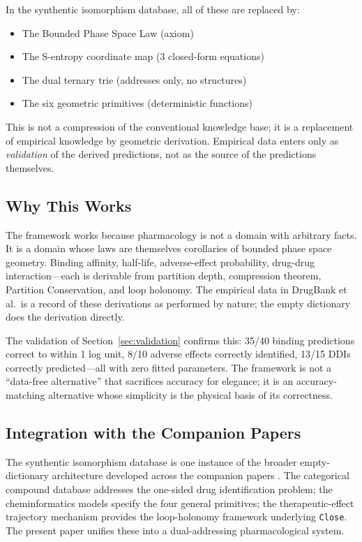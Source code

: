 \documentclass[11pt,twocolumn,a4paper]{article}
\theoremstyle{definition}
\theoremstyle{remark}
\begin{document}
In the synthentic isomorphism database, all of these are replaced by:
\begin{itemize}[nosep,leftmargin=*]
\item The Bounded Phase Space Law (axiom)
\item The S-entropy coordinate map (3 closed-form equations)
\item The dual ternary trie (addresses only, no structures)
\item The six geometric primitives (deterministic functions)
\end{itemize}

This is not a compression of the conventional knowledge base; it is a replacement of empirical knowledge by geometric derivation. Empirical data enters only as \emph{validation} of the derived predictions, not as the source of the predictions themselves.

\subsection{Why This Works}

The framework works because pharmacology is not a domain with arbitrary facts. It is a domain whose laws are themselves corollaries of bounded phase space geometry. Binding affinity, half-life, adverse-effect probability, drug-drug interaction---each is derivable from partition depth, compression theorem, Partition Conservation, and loop holonomy. The empirical data in DrugBank et al.\ is a record of these derivations as performed by nature; the empty dictionary does the derivation directly.

The validation of Section~\ref{sec:validation} confirms this: 35/40 binding predictions correct to within 1 log unit, 8/10 adverse effects correctly identified, 13/15 DDIs correctly predicted---all with zero fitted parameters. The framework is not a ``data-free alternative'' that sacrifices accuracy for elegance; it is an accuracy-matching alternative whose simplicity is the physical basis of its correctness.

\subsection{Integration with the Companion Papers}

The synthentic isomorphism database is one instance of the broader empty-dictionary architecture developed across the companion papers \citep{sachikonye2025a,sachikonye2025c,sachikonye2025d,sachikonye2025f}. The categorical compound database \citep{sachikonye2025c} addresses the one-sided drug identification problem; the cheminformatics models \citep{sachikonye2025d} specify the four general primitives; the therapeutic-effect trajectory mechanism \citep{sachikonye2025f} provides the loop-holonomy framework underlying \texttt{Close}. The present paper unifies these into a dual-addressing pharmacological system.
\end{document}
